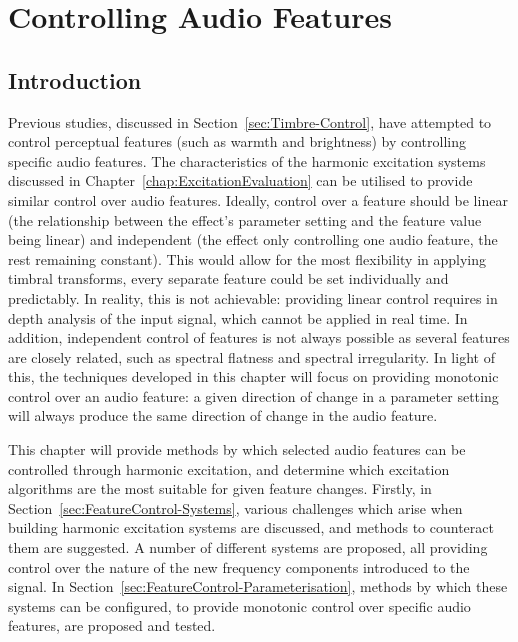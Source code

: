 
\chapter{Controlling Audio Features} %
\label{chap:FeatureControl}

\section{Introduction}
\label{sec:FeatureControl-Introduction}
	Previous studies, discussed in Section~\ref{sec:Timbre-Control}, have attempted to control perceptual features
	(such as warmth and brightness) by controlling specific audio features. The characteristics of the harmonic
	excitation systems discussed in Chapter~\ref{chap:ExcitationEvaluation} can be utilised to provide similar control
	over audio features. Ideally, control over a feature should be linear (the relationship between the effect's
	parameter setting and the feature value being linear) and independent (the effect only controlling one audio
	feature, the rest remaining constant). This would allow for the most flexibility in applying timbral transforms,
	every separate feature could be set individually and predictably. In reality, this is not achievable: providing
	linear control requires in depth analysis of the input signal, which cannot be applied in real time. In addition,
	independent control of features is not always possible as several features are closely related, such as spectral
	flatness and spectral irregularity. In light of this, the techniques developed in this chapter will focus on
	providing monotonic control over an audio feature: a given direction of change in a parameter setting will always
	produce the same direction of change in the audio feature.
	
	This chapter will provide methods by which selected audio features can be controlled through harmonic excitation,
	and determine which excitation algorithms are the most suitable for given feature changes. Firstly, in
	Section~\ref{sec:FeatureControl-Systems}, various challenges which arise when building harmonic excitation systems
	are discussed, and methods to counteract them are suggested. A number of different systems are proposed, all
	providing control over the nature of the new frequency components introduced to the signal. In
	Section~\ref{sec:FeatureControl-Parameterisation}, methods by which these systems can be configured, to provide
	monotonic control over specific audio features, are proposed and tested.

